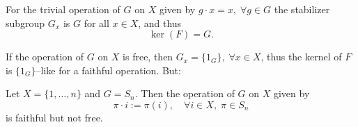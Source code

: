 \documentclass[12pt]{article}
\begin{document}
For the trivial operation of $G$ on $X$ given by $g \cdot x =x, \; \forall g \in G$
the stabilizer subgroup $G_x$ is $G$ for all $x \in X$, and thus
\begin{displaymath}
\operatorname{ker}(F) =G.
\end{displaymath}

If the operation of $G$ on $X$ is free, then
$G_x =\{1_G\}, \; \forall  x \in X$, thus the kernel of $F$ is 
$\{1_G\}$--like for a faithful operation. But:

Let $X=\{1, \ldots, n\}$ and $G=S_n$. Then the operation of $G$ on $X$ 
given by
\begin{displaymath}
\pi \cdot i := \pi(i), \quad \forall i \in X,\; \pi \in S_n
\end{displaymath}
is faithful but not free.
\end{document}
